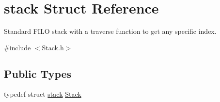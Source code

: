 \hypertarget{structstack}{}\section{stack Struct Reference}
\label{structstack}


Standard F\+I\+LO stack with a traverse function to get any specific index.  




{\ttfamily \#include $<$Stack.\+h$>$}

\subsection*{Public Types}
\begin{DoxyCompactItemize}
\item 
typedef struct \hyperlink{structstack}{stack} \hyperlink{structstack_aa7883e8bf747b9dedec990b539df2cc0}{Stack}
\end{DoxyCompactItemize}
